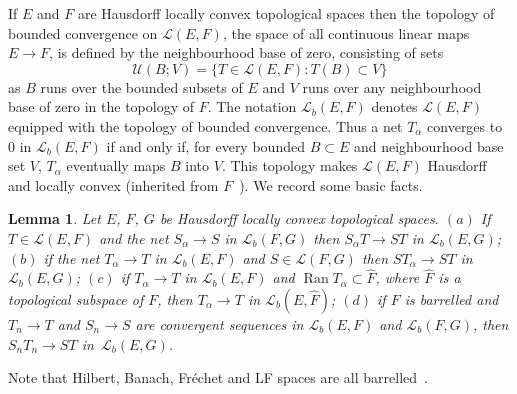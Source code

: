 \documentclass[11pt]{article}
\numberwithin{equation}{section}
\numberwithin{equation}{section}
\newtheorem{Lemma}[Theorem]{Lemma}
\newcommand{\LL}{{\mathcal L}}
\newcommand{\Ran}{\operatorname{Ran}}
\newcommand{\Uf}{{\mathscr U}}
\begin{document}
 If $E$ and $F$ are Hausdorff locally convex topological spaces then the topology of bounded convergence on $\LL(E,F)$, the space of all continuous linear maps $E\to F$, is defined by the neighbourhood base of zero, consisting of sets
 \begin{equation*}
 	\Uf(B;V) = \{T\in \LL(E,F)\colon T(B)\subset V\}
 \end{equation*}
 as $B$ runs over the bounded subsets of $E$ and $V$ runs over any neighbourhood base of zero in the topology of $F$. The notation $\LL_b(E,F)$ denotes $\LL(E,F)$ equipped with the topology of bounded convergence.
 Thus a net $T_\alpha$ converges to $0$ in $\LL_b(E,F)$
 if and only if, for every bounded $B\subset E$ and neighbourhood base set $V$,
 $T_\alpha$ eventually maps $B$ into $V$. This topology makes $\LL(E,F)$ Hausdorff and locally convex (inherited from $F$~\cite[p.~336]{Treves:TVS}). We record some basic facts.
 \begin{Lemma}\label{lem:Lb_basic}
 	Let $E$, $F$, $G$ be Hausdorff locally convex topological spaces. $(a)$ If $T\in \LL(E,F)$ and the net $S_\alpha\to S$ in $\LL_b(F,G)$ then $S_\alpha T\to ST$ in $\LL_b(E,G)$; $(b)$ if the net $T_\alpha\to T$ in $\LL_b(E,F)$ and $S\in \LL(F,G)$ then
 	$ST_\alpha\to ST$ in $\LL_b(E,G)$; $(c)$ if $T_\alpha\to T$ in $\LL_b(E,F)$ and $\Ran T_\alpha\subset \hat{F}$, where $\hat{F}$ is a topological subspace of $F$, then $T_\alpha\to T$ in $\LL_b(E,\hat{F})$; $(d)$ if $F$ is barrelled and $T_n\to T$ and $S_n\to S$ are convergent \emph{sequences} in $\LL_b(E,F)$ and $\LL_b(F,G)$, then $S_n T_n\to ST$ in~$\LL_b(E,G)$.
 \end{Lemma}
 Note that Hilbert, Banach, Fr\'echet and LF spaces are all barrelled~\cite[Chapter~33]{Treves:TVS}.
\end{document}
